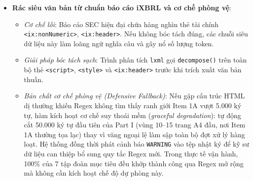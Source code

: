 \begin{itemize}
    \item \textbf{Rác siêu văn bản từ chuẩn báo cáo iXBRL và cơ chế phòng vệ}:
    \begin{itemize}
        \item \textit{Cơ chế lỗi}: Báo cáo SEC hiện đại chứa hàng nghìn thẻ tài chính \texttt{<ix:nonNumeric>}, \texttt{<ix:header>}. Nếu không bóc tách đúng, các chuỗi siêu dữ liệu này làm loãng ngữ nghĩa câu và gây nổ số lượng token.
        \item \textit{Giải pháp bóc tách sạch}: Trình phân tích \texttt{lxml} gọi \texttt{decompose()} trên toàn bộ thẻ \texttt{<script>}, \texttt{<style>} và \texttt{<ix:header>} trước khi trích xuất văn bản thuần.
        \item \textit{Bản chất cơ chế phòng vệ (Defensive Fallback)}: Nếu gặp cấu trúc HTML dị thường khiến Regex không tìm thấy ranh giới Item 1A vượt 5.000 ký tự, hàm kích hoạt cơ chế suy thoái mềm (\textit{graceful degradation}): tự động cắt 50.000 ký tự đầu tiên của Part I (vùng 10--15 trang A4 đầu, nơi Item 1A thường tọa lạc) thay vì văng ngoại lệ làm sập toàn bộ đợt xử lý hàng loạt. Hệ thống đồng thời phát cảnh báo \texttt{WARNING} vào tệp nhật ký để kỹ sư dữ liệu can thiệp bổ sung quy tắc Regex mới. Trong thực tế vận hành, 100\% của 7 tập đoàn mục tiêu đều khớp thành công qua Regex mở rộng mà không cần kích hoạt chế độ dự phòng này.
    \end{itemize}
\end{itemize}
